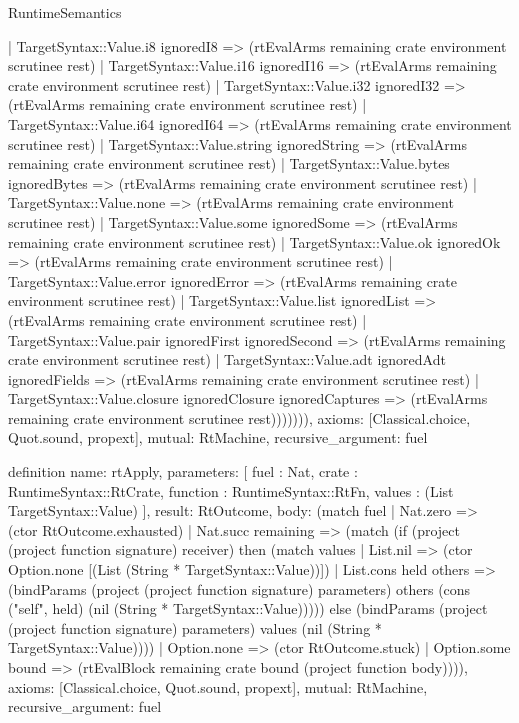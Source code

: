 \begin{lexlean}{RuntimeSemantics}
\begin{semanticmodule}
{              | TargetSyntax::Value.i8 ignoredI8 => (rtEvalArms remaining crate environment scrutinee rest)
              | TargetSyntax::Value.i16 ignoredI16 => (rtEvalArms remaining crate environment scrutinee rest)
              | TargetSyntax::Value.i32 ignoredI32 => (rtEvalArms remaining crate environment scrutinee rest)
              | TargetSyntax::Value.i64 ignoredI64 => (rtEvalArms remaining crate environment scrutinee rest)
              | TargetSyntax::Value.string ignoredString => (rtEvalArms remaining crate environment scrutinee rest)
              | TargetSyntax::Value.bytes ignoredBytes => (rtEvalArms remaining crate environment scrutinee rest)
              | TargetSyntax::Value.none => (rtEvalArms remaining crate environment scrutinee rest)
              | TargetSyntax::Value.some ignoredSome => (rtEvalArms remaining crate environment scrutinee rest)
              | TargetSyntax::Value.ok ignoredOk => (rtEvalArms remaining crate environment scrutinee rest)
              | TargetSyntax::Value.error ignoredError => (rtEvalArms remaining crate environment scrutinee rest)
              | TargetSyntax::Value.list ignoredList => (rtEvalArms remaining crate environment scrutinee rest)
              | TargetSyntax::Value.pair ignoredFirst ignoredSecond => (rtEvalArms remaining crate environment scrutinee rest)
              | TargetSyntax::Value.adt ignoredAdt ignoredFields => (rtEvalArms remaining crate environment scrutinee rest)
              | TargetSyntax::Value.closure ignoredClosure ignoredCaptures => (rtEvalArms remaining crate environment scrutinee rest))))))),
  axioms: [Classical.choice, Quot.sound, propext],
  mutual: RtMachine,
  recursive_argument: fuel
}

definition{
  name: rtApply,
  parameters: [
    fuel : Nat,
    crate : RuntimeSyntax::RtCrate,
    function : RuntimeSyntax::RtFn,
    values : (List TargetSyntax::Value)
  ],
  result: RtOutcome,
  body: (match fuel
    | Nat.zero => (ctor RtOutcome.exhausted)
    | Nat.succ remaining => (match (if (project (project function signature) receiver) then (match values
        | List.nil => (ctor Option.none [(List (String * TargetSyntax::Value))])
        | List.cons held others => (bindParams (project (project function signature) parameters) others (cons ("self", held) (nil (String * TargetSyntax::Value))))) else (bindParams (project (project function signature) parameters) values (nil (String * TargetSyntax::Value))))
      | Option.none => (ctor RtOutcome.stuck)
      | Option.some bound => (rtEvalBlock remaining crate bound (project function body)))),
  axioms: [Classical.choice, Quot.sound, propext],
  mutual: RtMachine,
  recursive_argument: fuel
}


\end{semanticmodule}
\end{lexlean}
